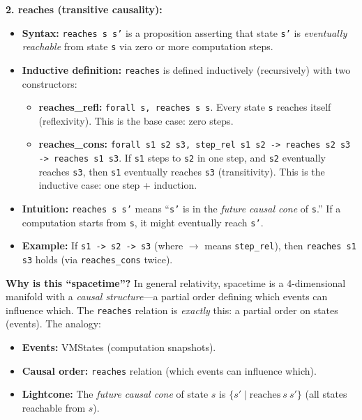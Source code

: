 \textbf{2. reaches (transitive causality):}
\begin{itemize}
    \item \textbf{Syntax:} \texttt{reaches s s'} is a proposition asserting that state \texttt{s'} is \textit{eventually reachable} from state \texttt{s} via zero or more computation steps.
    
    \item \textbf{Inductive definition:} \texttt{reaches} is defined inductively (recursively) with two constructors:
    \begin{itemize}
        \item \textbf{reaches\_refl:} \texttt{forall s, reaches s s}. Every state \texttt{s} reaches itself (reflexivity). This is the base case: zero steps.
        
        \item \textbf{reaches\_cons:} \texttt{forall s1 s2 s3, step\_rel s1 s2 -> reaches s2 s3 -> reaches s1 s3}. If \texttt{s1} steps to \texttt{s2} in one step, and \texttt{s2} eventually reaches \texttt{s3}, then \texttt{s1} eventually reaches \texttt{s3} (transitivity). This is the inductive case: one step + induction.
    \end{itemize}
    
    \item \textbf{Intuition:} \texttt{reaches s s'} means ``\texttt{s'} is in the \textit{future causal cone} of \texttt{s}.'' If a computation starts from \texttt{s}, it might eventually reach \texttt{s'}.
    
    \item \textbf{Example:} If \texttt{s1 -> s2 -> s3} (where $\to$ means \texttt{step\_rel}), then \texttt{reaches s1 s3} holds (via \texttt{reaches\_cons} twice).
\end{itemize}

\textbf{Why is this ``spacetime''?} In general relativity, spacetime is a 4-dimensional manifold with a \textit{causal structure}---a partial order defining which events can influence which. The \texttt{reaches} relation is \textit{exactly} this: a partial order on states (events). The analogy:
\begin{itemize}
    \item \textbf{Events:} VMStates (computation snapshots).
    \item \textbf{Causal order:} \texttt{reaches} relation (which events can influence which).
    \item \textbf{Lightcone:} The \textit{future causal cone} of state $s$ is $\{s' \mid \text{reaches}\ s\ s'\}$ (all states reachable from $s$).
\end{itemize}


